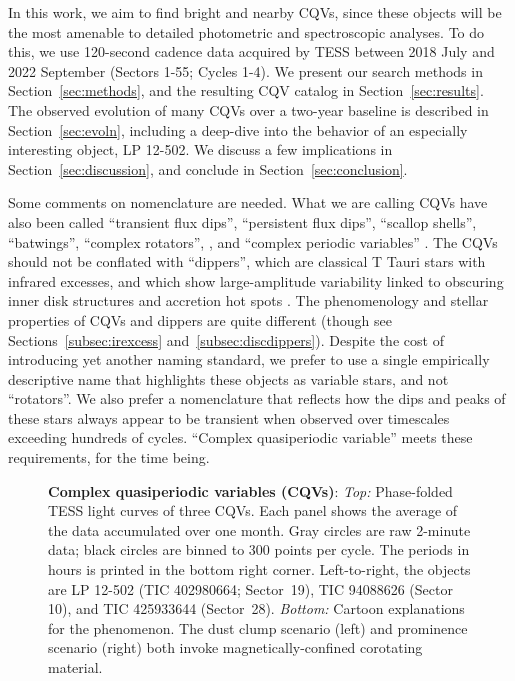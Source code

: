 \documentclass[11pt,twocolumn,tighten]{aastex63}
\begin{document}
In this work, we aim to find bright and nearby CQVs, since these
objects will be the most amenable to detailed photometric and
spectroscopic analyses.  To do this, we use 120-second cadence data
acquired by TESS between 2018 July and 2022 September (Sectors 1-55;
Cycles 1-4).  We present our search methods in
Section~\ref{sec:methods}, and the resulting CQV catalog in
Section~\ref{sec:results}.  The observed evolution of many CQVs over a
two-year baseline is described in Section~\ref{sec:evoln}, including a
deep-dive into the behavior of an especially interesting object, LP
12-502.  We discuss a few implications in
Section~\ref{sec:discussion}, and conclude in
Section~\ref{sec:conclusion}.

Some comments on nomenclature are needed.  What we are calling CQVs
have also been called ``transient flux dips'', ``persistent flux
dips'', ``scallop shells'', ``batwings'', \citep{2017AJ....153..152S}
``complex rotators'',
\citep{2019ApJ...876..127Z,2022AJ....163..144G,2023ApJ...945..114P},
and ``complex periodic variables'' \citep{2023MNRAS.518.2921K}.  The
CQVs should not be conflated with ``dippers'', which are classical T
Tauri stars with infrared excesses, and which show large-amplitude
variability linked to obscuring inner disk structures and accretion
hot spots \citep{2014AJ....147...82C,2021ApJ...908...16R}.  The
phenomenology and stellar properties of CQVs and dippers are
quite different (though see Sections~\ref{subsec:irexcess}
and~\ref{subsec:discdippers}).  Despite the cost of introducing yet
another naming standard, we prefer to use a single empirically
descriptive name that highlights these objects as variable stars, and
not ``rotators''.  We also prefer a nomenclature that reflects how the
dips and peaks of these stars always appear to be transient 
when observed over timescales exceeding hundreds of cycles.  ``Complex
quasiperiodic variable'' meets these requirements, for the time being.



\begin{figure*}[!t]
	\begin{center}
		
		\vspace{-0.6cm}
	\end{center}
		\vspace{-0.3cm}
	\caption{
		{\bf Complex quasiperiodic variables (CQVs)}:
    {\it Top:} Phase-folded TESS light curves of three CQVs.  Each panel shows
    the average of the data accumulated over one month.
    Gray circles are raw 2-minute data; black
    circles are binned to 300 points per cycle.  The periods in hours
    is printed in the
    bottom right corner.  Left-to-right, the objects are LP
    12-502 (TIC 402980664; Sector~19), TIC 94088626 (Sector 10), and
    TIC 425933644 (Sector~28).
    {\it Bottom:} Cartoon explanations for the phenomenon.  The dust
    clump scenario (left) and prominence scenario (right) both invoke
    magnetically-confined corotating material.
	}
	\label{fig:f1}
\end{figure*}
\end{document}
